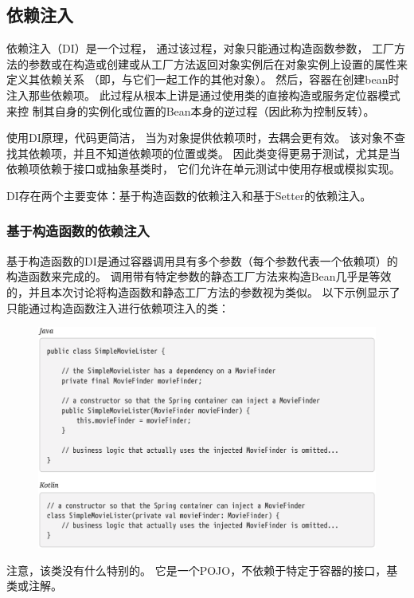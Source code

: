 \subsection{依赖注入}

依赖注入（DI）是一个过程，
通过该过程，对象只能通过构造函数参数，
工厂方法的参数或在构造或创建或从工厂方法返回对象实例后在对象实例上设置的属性来定义其依赖关系
（即，与它们一起工作的其他对象）。 然后，容器在创建bean时注入那些依赖项。 
此过程从根本上讲是通过使用类的直接构造或服务定位器模式来控
制其自身的实例化或位置的Bean本身的逆过程（因此称为控制反转）。

使用DI原理，代码更简洁，
当为对象提供依赖项时，去耦会更有效。 
该对象不查找其依赖项，并且不知道依赖项的位置或类。 
因此类变得更易于测试，尤其是当依赖项依赖于接口或抽象基类时，
它们允许在单元测试中使用存根或模拟实现。

DI存在两个主要变体：基于构造函数的依赖注入和基于Setter的依赖注入。

\subsubsection{基于构造函数的依赖注入}
基于构造函数的DI是通过容器调用具有多个参数（每个参数代表一个依赖项）的构造函数来完成的。 调用带有特定参数的静态工厂方法来构造Bean几乎是等效的，并且本次讨论将构造函数和静态工厂方法的参数视为类似。 以下示例显示了只能通过构造函数注入进行依赖项注入的类：

\newpage
\begin{figure}[ht]
    \centering
    \includegraphics[width=1\linewidth]{./Figure/IMG_code_21.png}
\end{figure}

注意，该类没有什么特别的。 它是一个POJO，不依赖于特定于容器的接口，基类或注解。

